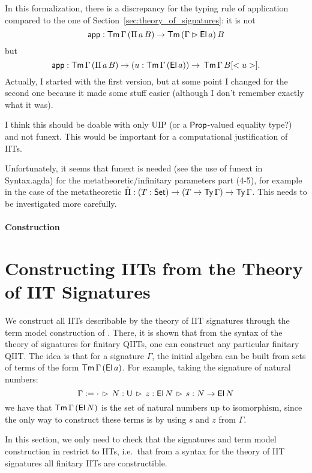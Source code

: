 \documentclass[a4paper,UKenglish,cleveref, autoref]{lipics-v2019}
\begin{document}
In this formalization, there is a discrepancy for the typing rule of application
compared to the one of Section~\ref{sec:theory_of_signatures}: it is not
\[
   \mathsf{app}  : \mathsf{Tm}\,\Gamma\,(\Pi\,a\,B)\rightarrow\mathsf{Tm}\,(\Gamma\rhd \mathsf{El}\,a)\,B
\]
but
\[
   \mathsf{app}  : \mathsf{Tm}\,\Gamma\,(\Pi\,a\,B)\rightarrow(u : \mathsf{Tm}\,\Gamma\,(\mathsf{El}\,a))\rightarrow\,\mathsf{Tm}\,\Gamma\,B[<u>].
\]
Actually, I started with the first version, but at some point I
changed for the second one because it made some stuff easier (although
I don't remember exactly what it was).

I think this should be doable with only UIP (or a $\mathsf{Prop}$-valued
equality type?) and not funext. This would be important for a
computational justification of IITs.

Unfortunately, it seems that funext is needed (see the use of funext in
Syntax.agda) for the metatheoretic/infinitary
parameters part (4-5), for example in the case of the metatheoretic
$ \hat{\Pi}  : (T:\mathsf{Set})\rightarrow(T\rightarrow\mathsf{Ty}\,\Gamma)\rightarrow\mathsf{Ty}\,\Gamma $. This needs to be
investigated more carefully.

\paragraph*{Construction}


\section{Constructing IITs from the Theory of IIT Signatures}
\label{sec:constructingiits}

We construct all IITs describable by the theory of IIT signatures through the
term model construction of \cite{Kaposi:2019:CQI:3302515.3290315}. There, it is
shown that from the syntax of the theory of signatures for finitary QIITs, one
can construct any particular finitary QIIT. The idea is that for a signature
$\Gamma$, the initial algebra can be built from sets of terms of the form
$\mathsf{Tm}\,\Gamma\,(\mathsf{El}\,a)$. For example, taking the signature of natural numbers:
\[
  \Gamma := \cdot\,\rhd\,N:\mathsf{U}\,\rhd\,z : \mathsf{El}\,N\,\rhd\,s : N \rightarrow \mathsf{El}\,N
\]
we have that $\mathsf{Tm}\,\Gamma\,(\mathsf{El}\,N)$ is the set of natural numbers up to isomorphism,
since the only way to construct these terms is by using $s$ and $z$ from $\Gamma$.

In this section, we only need to check that the signatures and term model
construction in \cite{Kaposi:2019:CQI:3302515.3290315} restrict to IITs,
i.e.\ that from a syntax for the theory of IIT signatures all finitary IITs are
constructible.
\end{document}
